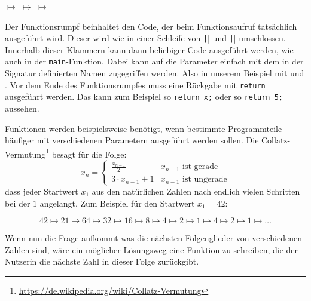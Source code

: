 \begin{center}
	 $\mapsto$  $\mapsto$  $\mapsto$ 
\end{center}


Der Funktionsrumpf beinhaltet den Code, der beim Funktionsaufruf tatsächlich ausgeführt wird.
Dieser wird wie in einer Schleife von \texttt|{| und \texttt|}| umschlossen.
Innerhalb dieser Klammern kann dann beliebiger Code ausgeführt werden, wie auch in der \texttt{main}-Funktion.
Dabei kann auf die Parameter einfach mit dem in der Signatur definierten Namen zugegriffen werden.
Also in unserem Beispiel mit  und .
Vor dem Ende des Funktionsrumpfes muss eine Rückgabe mit \texttt{return} ausgeführt werden.
Das kann zum Beispiel so \texttt{return x;} oder so \texttt{return 5;} aussehen.

Funktionen werden beispielsweise benötigt, wenn bestimmte Programmteile häufiger mit verschiedenen Parametern ausgeführt werden sollen.
Die Collatz-Vermutung\footnote{\url{https://de.wikipedia.org/wiki/Collatz-Vermutung}} besagt für die Folge:
\[
	x_n =
	\begin{cases}
		\frac{x_{n-1}}{2} & x_{n-1} \text{ ist gerade} \\
		3 \cdot x_{n-1} + 1 & x_{n-1} \text{ ist ungerade}
	\end{cases}
\]
dass jeder Startwert $x_1$ aus den natürlichen Zahlen nach endlich vielen Schritten bei der $1$ angelangt.
Zum Beispiel für den Startwert $x_1 = 42$:

\[
    42 \mapsto 21 \mapsto 64 \mapsto 32 \mapsto 16 \mapsto 8 \mapsto 4 \mapsto 2 \mapsto 1 \mapsto 4 \mapsto 2 \mapsto 1 \mapsto \ldots
\]

Wenn nun die Frage aufkommt was die nächsten Folgenglieder von verschiedenen Zahlen sind, wäre ein möglicher Lösungsweg eine Funktion zu schreiben, die der Nutzerin die nächste Zahl in dieser Folge zurückgibt.


